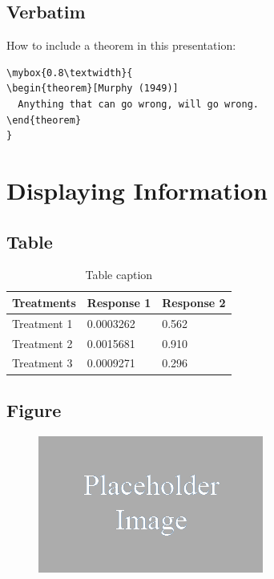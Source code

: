 \documentclass[
paper=128mm:96mm, %
fontsize=11pt, %
pagesize, %
parskip=half-, %
]{scrartcl} %
\theoremstyle{mythmstyle} %
\newtheorem{theorem}{Theorem}[section] %
\newcommand*{\mybox}[2]{ %
  \par\noindent
  \begin{tikzpicture}[mynodestyle/.style={rectangle,draw=mygreen,thick,inner sep=2mm,text justified,top color=white,bottom color=white,above}]\node[mynodestyle,at={(0.5*#1+2mm+0.4pt,0)}]{ %
      \begin{minipage}[t]{#1}
        #2
      \end{minipage}
    };
  \end{tikzpicture}
  \par\vspace{-1.3em}}
\begin{document}

\subsection{Verbatim}

How to include a theorem in this presentation:
\begin{verbatim}
\mybox{0.8\textwidth}{
\begin{theorem}[Murphy (1949)]
  Anything that can go wrong, will go wrong.
\end{theorem}
}
\end{verbatim}

\clearpage



\section{Displaying Information}

\clearpage


\subsection{Table}

\begin{table}[h]
  \centering
  \begin{tabular}{l l l}
    \toprule
    \textbf{Treatments} & \textbf{Response 1} & \textbf{Response 2}\\
    \midrule
    Treatment 1 & 0.0003262 & 0.562 \\
    Treatment 2 & 0.0015681 & 0.910 \\
    Treatment 3 & 0.0009271 & 0.296 \\
    \bottomrule
  \end{tabular}
  \caption{Table caption}
\end{table}

\clearpage


\subsection{Figure}

\begin{figure}[h]
  \centering\includegraphics[width=0.4\linewidth]{placeholder}
\end{figure}
\end{document}
